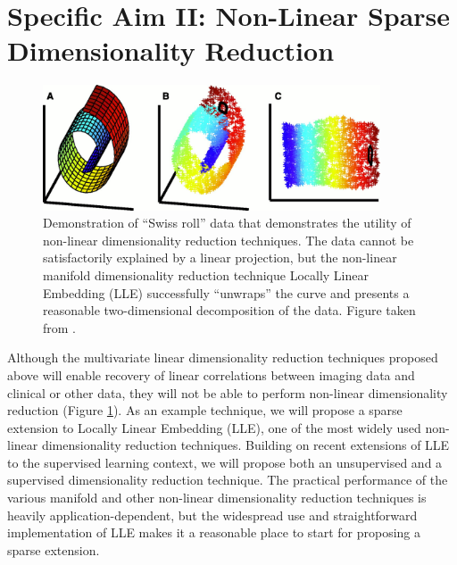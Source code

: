 \documentclass[11pt]{nih}
\begin{document}
\section*{Specific Aim II: Non-Linear Sparse Dimensionality Reduction}
\begin{figure}
\centering
\includegraphics[width=10cm]{swiss_roll.jpg}
\caption{Demonstration of ``Swiss roll'' data that demonstrates the utility of non-linear dimensionality reduction techniques.  The data cannot be satisfactorily explained by a linear projection, but the non-linear manifold dimensionality reduction technique Locally Linear Embedding (LLE) successfully ``unwraps'' the curve and presents a reasonable two-dimensional decomposition of the data.  Figure taken from \cite{roweis_nonlinear_2000}.}
\label{fig:swiss}
\end{figure}
Although the multivariate linear dimensionality reduction techniques proposed above will enable recovery of linear correlations between imaging data and clinical or other data, they will not be able to perform non-linear dimensionality reduction (Figure \ref{fig:swiss}).  As an example technique, we will propose a sparse extension to Locally Linear Embedding (LLE), one of the most widely used non-linear dimensionality reduction techniques.  Building on recent extensions of LLE to the supervised learning context, we will propose both an unsupervised and a supervised dimensionality reduction technique.   The practical performance of the various manifold and other non-linear dimensionality reduction techniques is heavily application-dependent, but the widespread use and straightforward implementation of LLE makes it a reasonable place to start for proposing a sparse extension.  
\end{document}
